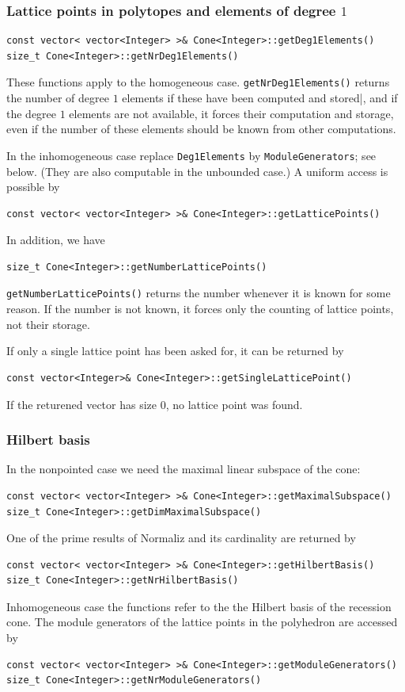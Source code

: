 \begin{small}
\subsubsection{Lattice points in polytopes and elements of degree $1$}

\begin{Verbatim}
const vector< vector<Integer> >& Cone<Integer>::getDeg1Elements()
size_t Cone<Integer>::getNrDeg1Elements()
\end{Verbatim}
These functions apply to the homogeneous case. \verb|getNrDeg1Elements()| returns the number of degree $1$ elements if these have been computed and stored|, and if the degree $1$ elements are not available, it forces their computation and storage, even if the number of these elements should be known from other computations.

In the inhomogeneous case replace \verb|Deg1Elements| by \verb|ModuleGenerators|; see below. (They are also computable in the unbounded case.) A uniform access is possible by
\begin{Verbatim}
const vector< vector<Integer> >& Cone<Integer>::getLatticePoints()
\end{Verbatim}

In addition, we have
\begin{Verbatim}
size_t Cone<Integer>::getNumberLatticePoints()
\end{Verbatim}
\verb|getNumberLatticePoints()| returns the number whenever it is known for some reason. If the number is not known, it forces only the counting of lattice points, not their storage.

If only a single lattice point has been asked for, it can be returned by 
\begin{Verbatim}
const vector<Integer>& Cone<Integer>::getSingleLatticePoint()
\end{Verbatim}
If the returened vector has size $0$, no lattice point was found.

\subsubsection{Hilbert basis}\label{HB_lib}

In the nonpointed case we need the maximal linear subspace of the cone:
\begin{Verbatim}
const vector< vector<Integer> >& Cone<Integer>::getMaximalSubspace()
size_t Cone<Integer>::getDimMaximalSubspace()
\end{Verbatim}

One of the prime results of Normaliz and its cardinality are returned by
\begin{Verbatim}
const vector< vector<Integer> >& Cone<Integer>::getHilbertBasis()
size_t Cone<Integer>::getNrHilbertBasis()
\end{Verbatim}
Inhomogeneous case the functions refer to the the Hilbert basis of the recession cone. The module generators of the lattice points in the polyhedron are accessed by
\begin{Verbatim}
const vector< vector<Integer> >& Cone<Integer>::getModuleGenerators()
size_t Cone<Integer>::getNrModuleGenerators()
\end{Verbatim}


\end{small}

